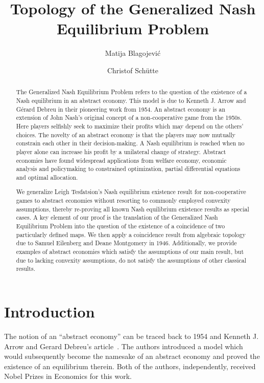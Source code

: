 \documentclass[a4paper,11pt,reqno,english]{amsart}
\author[Blagojevi\'c]{Matija Blagojevi\'{c}}
\author[Sch\"{u}tte]{Christof Sch\"{u}tte}
\title{Topology of the Generalized Nash Equilibrium Problem}
\theoremstyle{definition}
\begin{document}
\begin{abstract}
	The Generalized Nash Equilibrium Problem refers to the question of the existence of a Nash equilibrium in an abstract economy. This model is due to Kenneth J. Arrow and G\'erard Debreu in their pioneering work from 1954. An abstract economy is an extension of John Nash's original concept of a non-cooperative game from the 1950s. Here players selfishly seek to maximize their profits which may depend on the others' choices. The novelty of an abstract economy is that the players may now mutually constrain each other in their decision-making. A Nash equilibrium is reached when no player alone can increase his profit by a unilateral change of strategy. Abstract economies have found widespread applications from welfare economy, economic analysis and policymaking to constrained optimization, partial differential equations and optimal allocation.

	We generalize Leigh Tesfatsion's Nash equilibrium existence result for non-cooperative games to abstract economies without resorting to commonly employed convexity assumptions, thereby re-proving all known Nash equilibrium existence results as special cases. A key element of our proof is the translation of the Generalized Nash Equilibrium Problem into the question of the existence of a coincidence of two particularly defined maps. We then apply a coincidence result from algebraic topology due to Samuel Eilenberg and Deane Montgomery in 1946.
	Additionally, we provide examples of abstract economies which satisfy the assumptions of our main result, but due to lacking convexity assumptions, do not satisfy the assumptions of other classical results.

\end{abstract}
\maketitle
\section{Introduction}


The notion of an ``abstract economy'' can be traced back to 1954 and Kenneth J. Arrow and Gerard Debreu's article~\cite{ArrowDebreu1954}.
The authors introduced a model which would subsequently become the namesake of an abstract economy and proved the existence of an equilibrium therein.
Both of the authors, independently, received Nobel Prizes in Economics for this work.
\end{document}
